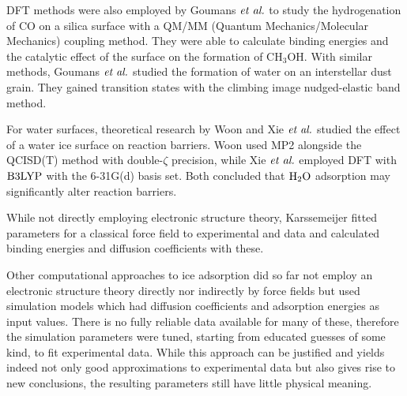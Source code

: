 DFT methods were also employed by Goumans $\emph{et al.}$ to study the hydrogenation of
CO on a silica surface with a QM/MM (Quantum Mechanics/Molecular
Mechanics) coupling method.
They were able to calculate binding energies and the catalytic effect of the
surface on the formation of CH$_3$OH.\cite{GoumansCatlowBrown2008} With similar
methods, Goumans $\emph{et al.}$  studied the formation of water on an
interstellar dust grain.\cite{GoumansCatlowBrownEtAl2009} They gained transition
states with the climbing image nudged-elastic band method\cite{HenkelmanUberuagaJonsson2000}.

For water surfaces, theoretical research by Woon\cite{Woon2002}
and Xie $\emph{et al.}$\cite{XieDingSun2006} studied the effect of a water ice surface
on reaction barriers. Woon used MP2 \cite{MP2} alongside the QCISD(T)
\cite{QCISD} method with double-$\zeta$ precision, while Xie $\emph{et al.}$
employed DFT with $\text{B3LYP}$\cite{Becke1993,StephensDevlinChabalowskiEtAl1994}
with the 6-31G(d)\cite{HariharanPople1973} basis set. Both concluded that $\text H _2 \text O$
adsorption may significantly alter reaction barriers.

While not directly employing electronic structure theory, Karssemeijer fitted
parameters for a classical force field to experimental and  data
and calculated binding energies and diffusion coefficients with
these.\cite{KarssemeijerPedersenJonssonEtAl2012}

Other computational approaches to ice adsorption did so far not employ an
electronic structure theory directly nor indirectly by force fields but used
simulation models which had diffusion coefficients and adsorption energies as input values. There is no
fully reliable data available for many of these, therefore the simulation
parameters were tuned, starting from educated guesses of some kind, to fit
experimental data. While this approach can be justified and yields indeed not
only good approximations to experimental data but also gives rise to new conclusions,
the resulting parameters still have little physical meaning.

